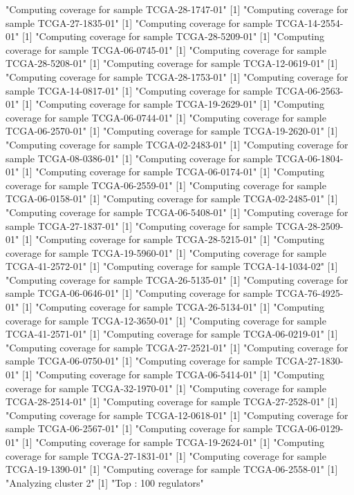 \documentclass{article}
\begin{document}
\begin{Schunk}
[1] "Computing coverage for sample TCGA-28-1747-01"
[1] "Computing coverage for sample TCGA-27-1835-01"
[1] "Computing coverage for sample TCGA-14-2554-01"
[1] "Computing coverage for sample TCGA-28-5209-01"
[1] "Computing coverage for sample TCGA-06-0745-01"
[1] "Computing coverage for sample TCGA-28-5208-01"
[1] "Computing coverage for sample TCGA-12-0619-01"
[1] "Computing coverage for sample TCGA-28-1753-01"
[1] "Computing coverage for sample TCGA-14-0817-01"
[1] "Computing coverage for sample TCGA-06-2563-01"
[1] "Computing coverage for sample TCGA-19-2629-01"
[1] "Computing coverage for sample TCGA-06-0744-01"
[1] "Computing coverage for sample TCGA-06-2570-01"
[1] "Computing coverage for sample TCGA-19-2620-01"
[1] "Computing coverage for sample TCGA-02-2483-01"
[1] "Computing coverage for sample TCGA-08-0386-01"
[1] "Computing coverage for sample TCGA-06-1804-01"
[1] "Computing coverage for sample TCGA-06-0174-01"
[1] "Computing coverage for sample TCGA-06-2559-01"
[1] "Computing coverage for sample TCGA-06-0158-01"
[1] "Computing coverage for sample TCGA-02-2485-01"
[1] "Computing coverage for sample TCGA-06-5408-01"
[1] "Computing coverage for sample TCGA-27-1837-01"
[1] "Computing coverage for sample TCGA-28-2509-01"
[1] "Computing coverage for sample TCGA-28-5215-01"
[1] "Computing coverage for sample TCGA-19-5960-01"
[1] "Computing coverage for sample TCGA-41-2572-01"
[1] "Computing coverage for sample TCGA-14-1034-02"
[1] "Computing coverage for sample TCGA-26-5135-01"
[1] "Computing coverage for sample TCGA-06-0646-01"
[1] "Computing coverage for sample TCGA-76-4925-01"
[1] "Computing coverage for sample TCGA-26-5134-01"
[1] "Computing coverage for sample TCGA-12-3650-01"
[1] "Computing coverage for sample TCGA-41-2571-01"
[1] "Computing coverage for sample TCGA-06-0219-01"
[1] "Computing coverage for sample TCGA-27-2521-01"
[1] "Computing coverage for sample TCGA-06-0750-01"
[1] "Computing coverage for sample TCGA-27-1830-01"
[1] "Computing coverage for sample TCGA-06-5414-01"
[1] "Computing coverage for sample TCGA-32-1970-01"
[1] "Computing coverage for sample TCGA-28-2514-01"
[1] "Computing coverage for sample TCGA-27-2528-01"
[1] "Computing coverage for sample TCGA-12-0618-01"
[1] "Computing coverage for sample TCGA-06-2567-01"
[1] "Computing coverage for sample TCGA-06-0129-01"
[1] "Computing coverage for sample TCGA-19-2624-01"
[1] "Computing coverage for sample TCGA-27-1831-01"
[1] "Computing coverage for sample TCGA-19-1390-01"
[1] "Computing coverage for sample TCGA-06-2558-01"
[1] "Analyzing cluster 2"
[1] "Top :  100  regulators"

\end{Schunk}
\end{document}

